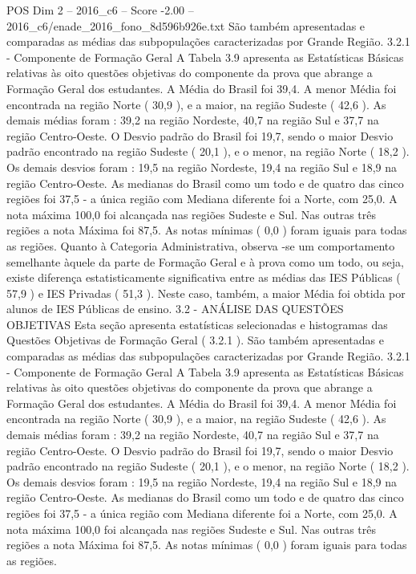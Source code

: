 \begin{textsample}{POS Dim 2 – 2016\_c6 – Score -2.00 – 2016\_c6/enade\_2016\_fono\_8d596b926e.txt}
São também apresentadas e comparadas as médias das subpopulações caracterizadas por Grande Região. 3.2.1 - Componente de Formação Geral A Tabela 3.9 apresenta as Estatísticas Básicas relativas às oito questões objetivas do componente da prova que abrange a Formação Geral dos estudantes.
A Média do Brasil foi 39,4.
A menor Média foi encontrada na região Norte ( 30,9 ), e a maior, na região Sudeste ( 42,6 ).
As demais médias foram : 39,2 na região Nordeste, 40,7 na região Sul e 37,7 na região Centro-Oeste.
O Desvio padrão do Brasil foi 19,7, sendo o maior Desvio padrão encontrado na região Sudeste ( 20,1 ), e o menor, na região Norte ( 18,2 ).
Os demais desvios foram : 19,5 na região Nordeste, 19,4 na região Sul e 18,9 na região Centro-Oeste.
As medianas do Brasil como um todo e de quatro das cinco regiões foi 37,5 - a única região com Mediana diferente foi a Norte, com 25,0.
A nota máxima 100,0 foi alcançada nas regiões Sudeste e Sul.
Nas outras três regiões a nota Máxima foi 87,5.
As notas mínimas ( 0,0 ) foram iguais para todas as regiões.
Quanto à Categoria Administrativa, observa -se um comportamento semelhante àquele da parte de Formação Geral e à prova como um todo, ou seja, existe diferença estatisticamente significativa entre as médias das IES Públicas ( 57,9 ) e IES Privadas ( 51,3 ).
Neste caso, também, a maior Média foi obtida por alunos de IES Públicas de ensino. 3.2 - ANÁLISE DAS QUESTÕES OBJETIVAS Esta seção apresenta estatísticas selecionadas e histogramas das Questões Objetivas de Formação Geral ( 3.2.1 ).
São também apresentadas e comparadas as médias das subpopulações caracterizadas por Grande Região. 3.2.1 - Componente de Formação Geral A Tabela 3.9 apresenta as Estatísticas Básicas relativas às oito questões objetivas do componente da prova que abrange a Formação Geral dos estudantes.
A Média do Brasil foi 39,4.
A menor Média foi encontrada na região Norte ( 30,9 ), e a maior, na região Sudeste ( 42,6 ).
As demais médias foram : 39,2 na região Nordeste, 40,7 na região Sul e 37,7 na região Centro-Oeste.
O Desvio padrão do Brasil foi 19,7, sendo o maior Desvio padrão encontrado na região Sudeste ( 20,1 ), e o menor, na região Norte ( 18,2 ).
Os demais desvios foram : 19,5 na região Nordeste, 19,4 na região Sul e 18,9 na região Centro-Oeste.
As medianas do Brasil como um todo e de quatro das cinco regiões foi 37,5 - a única região com Mediana diferente foi a Norte, com 25,0.
A nota máxima 100,0 foi alcançada nas regiões Sudeste e Sul.
Nas outras três regiões a nota Máxima foi 87,5.
As notas mínimas ( 0,0 ) foram iguais para todas as regiões.

\end{textsample}
